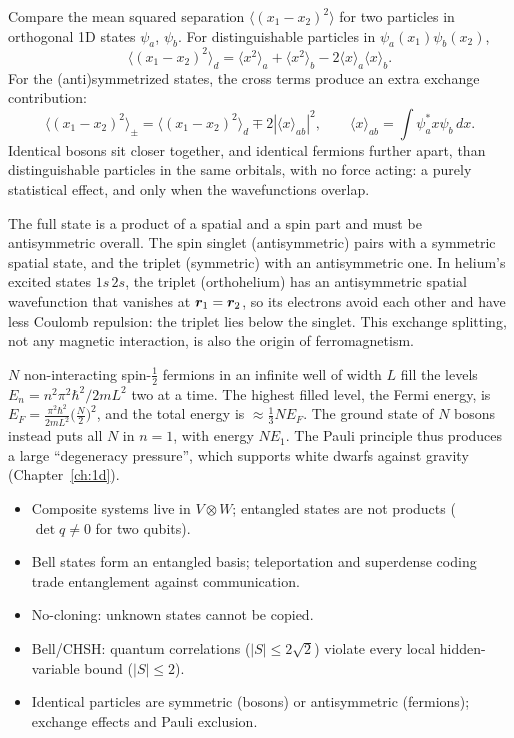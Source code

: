 \begin{example}
Compare the mean squared separation $\langle(x_1-x_2)^2\rangle$ for two particles in orthogonal 1D states $\psi_a$, $\psi_b$. For distinguishable particles in $\psi_a(x_1)\psi_b(x_2)$,
\[
    \langle(x_1-x_2)^2\rangle_d = \langle x^2\rangle_a + \langle x^2\rangle_b - 2\langle x\rangle_a\langle x\rangle_b .
\]
For the (anti)symmetrized states, the cross terms produce an extra exchange contribution:
\[
    \langle(x_1-x_2)^2\rangle_\pm = \langle(x_1-x_2)^2\rangle_d\mp2|\langle x\rangle_{ab}|^2,
    \qquad
    \langle x\rangle_{ab} = \int\psi_a^*x\psi_b\,dx .
\]
Identical bosons sit closer together, and identical fermions further apart, than distinguishable particles in the same orbitals, with no force acting: a purely statistical effect, and only when the wavefunctions overlap.
\end{example}

\begin{example}
The full state is a product of a spatial and a spin part and must be antisymmetric overall. The spin singlet (antisymmetric) pairs with a symmetric spatial state, and the triplet (symmetric) with an antisymmetric one. In helium's excited states $1s\,2s$, the triplet (orthohelium) has an antisymmetric spatial wavefunction that vanishes at $\bm{r}_1 = \bm{r}_2$, so its electrons avoid each other and have less Coulomb repulsion: the triplet lies below the singlet. This exchange splitting, not any magnetic interaction, is also the origin of ferromagnetism.
\end{example}

\begin{example}
$N$ non-interacting spin-$\frac12$ fermions in an infinite well of width $L$ fill the levels $E_n = n^2\pi^2\hbar^2/2mL^2$ two at a time. The highest filled level, the Fermi energy, is $E_F = \frac{\pi^2\hbar^2}{2mL^2}\bigl(\frac N2\bigr)^2$, and the total energy is $\approx\frac13NE_F$. The ground state of $N$ bosons instead puts all $N$ in $n = 1$, with energy $NE_1$. The Pauli principle thus produces a large ``degeneracy pressure'', which supports white dwarfs against gravity (Chapter~\ref{ch:1d}).
\end{example}

\begin{fact}
\leavevmode
\begin{itemize}
\item Composite systems live in $V\otimes W$; entangled states are not products ($\det q\neq0$ for two qubits).
\item Bell states form an entangled basis; teleportation and superdense coding trade entanglement against communication.
\item No-cloning: unknown states cannot be copied.
\item Bell/CHSH: quantum correlations ($|S|\le2\sqrt2$) violate every local hidden-variable bound ($|S|\le2$).
\item Identical particles are symmetric (bosons) or antisymmetric (fermions); exchange effects and Pauli exclusion.
\end{itemize}
\end{fact}
